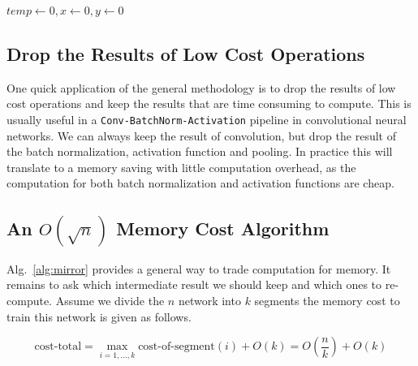 \begin{algorithm}[!t]
   \caption{Memory Planning with Budget}\label{alg:pack}
    $temp \leftarrow 0, x \leftarrow 0, y\leftarrow 0$\\
\end{algorithm}

\subsection{Drop the Results of Low Cost Operations} One quick application of the general methodology is to drop the results of low cost operations and keep the results that are time consuming to compute. This is usually useful in a \texttt{Conv-BatchNorm-Activation} pipeline in convolutional neural networks. We can always keep the result of convolution, but drop the result of the batch normalization, activation function and pooling. In practice this will translate to a memory saving with little computation overhead, as the computation for both batch normalization and activation functions are cheap.

\subsection{An $O(\sqrt{n})$ Memory Cost Algorithm}
Alg.~\ref{alg:mirror} provides a general way to trade computation for memory. It remains to ask which intermediate result we should keep and which ones to re-compute. Assume we divide the $n$ network into $k$ segments the memory cost to train this network is given as follows.

\begin{equation}
   \mbox{cost-total} =  \max_{i=1,\ldots,k} \mbox{cost-of-segment}(i) + O(k) = O\left(\frac{n}
   {k}\right) + O(k)
\end{equation}

